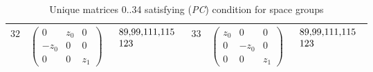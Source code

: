 \begin{table}[H]
\begin{center}
\begin{scriptsize}
\begin{tabular}{|l|l|l|l|l|l|}
$32$ & $\left(\begin{array}{rrr}
0 & z_{0} & 0 \\
-z_{0} & 0 & 0 \\
0 & 0 & z_{1}
\end{array}\right)$ & $\begin{tabular}{l}
89,99,111,115 \\
123 \\
\end{tabular}$ & $33$ & $\left(\begin{array}{rrr}
z_{0} & 0 & 0 \\
0 & -z_{0} & 0 \\
0 & 0 & z_{1}
\end{array}\right)$ & $\begin{tabular}{l}
89,99,111,115 \\
123 \\
\end{tabular}$ \\ \hline
\end{tabular}
\end{scriptsize}
\caption{Unique matrices 0..34 satisfying (\textit{PC}) condition for space groups}
\label{tab:norm_dim3_0}
\end{center}
\end{table}

\newpage

